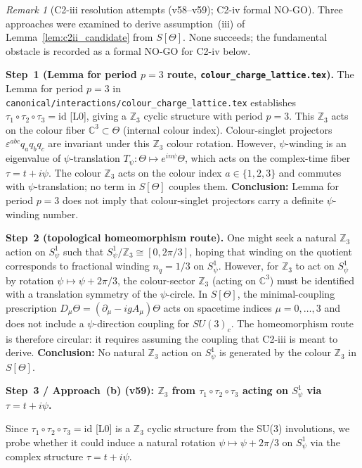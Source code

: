 \documentclass[12pt,a4paper]{article}
\theoremstyle{definition}
\theoremstyle{remark}
\newtheorem{remark}[theorem]{Remark}
\begin{document}
\begin{remark}[C2-iii resolution attempts (v58–v59); C2-iv formal NO-GO]
\label{rem:c2iii_attempts}
Three approaches were examined to derive assumption~(iii) of
Lemma~\ref{lem:c2ii_candidate} from $S[\Theta]$.  None succeeds;
the fundamental obstacle is recorded as a formal NO-GO for C2-iv below.

\medskip
\noindent\textbf{Step~1 (Lemma for period $p=3$ route, \texttt{colour\_charge\_lattice.tex}).}
The Lemma for period $p=3$ in
\texttt{canonical/interactions/colour\_charge\_lattice.tex}
establishes $\tau_1\circ\tau_2\circ\tau_3=\mathrm{id}$ [L0], giving a
$\mathbb{Z}_3$ cyclic structure with period $p=3$.
This $\mathbb{Z}_3$ acts on the colour fiber $\mathbb{C}^3\subset\Theta$
(internal colour index).
Colour-singlet projectors $\varepsilon^{abc}q_aq_bq_c$ are invariant under
this $\mathbb{Z}_3$ colour rotation.
However, $\psi$-winding is an eigenvalue of $\psi$-translation
$T_\psi\colon\Theta\mapsto e^{in\psi}\Theta$, which acts on the complex-time
fiber $\tau=t+i\psi$.
The colour $\mathbb{Z}_3$ acts on the colour index $a\in\{1,2,3\}$ and
commutes with $\psi$-translation; no term in $S[\Theta]$ couples them.
\textbf{Conclusion:} Lemma for period $p=3$ does not imply that colour-singlet
projectors carry a definite $\psi$-winding number.

\medskip
\noindent\textbf{Step~2 (topological homeomorphism route).}
One might seek a natural $\mathbb{Z}_3$ action on $S^1_\psi$ such that
$S^1_\psi/\mathbb{Z}_3\cong[0,2\pi/3]$, hoping that winding on the
quotient corresponds to fractional winding $n_q=1/3$ on $S^1_\psi$.
However, for $\mathbb{Z}_3$ to act on $S^1_\psi$ by rotation
$\psi\mapsto\psi+2\pi/3$, the colour-sector $\mathbb{Z}_3$ (acting on
$\mathbb{C}^3$) must be identified with a translation symmetry of the
$\psi$-circle.
In $S[\Theta]$, the minimal-coupling prescription
$D_\mu\Theta=(\partial_\mu-igA_\mu)\Theta$ acts on spacetime indices
$\mu=0,\ldots,3$ and does not include a $\psi$-direction coupling for
$SU(3)_c$.
The homeomorphism route is therefore circular: it requires assuming
the coupling that C2-iii is meant to derive.
\textbf{Conclusion:} No natural $\mathbb{Z}_3$ action on $S^1_\psi$
is generated by the colour $\mathbb{Z}_3$ in $S[\Theta]$.

\medskip
\noindent\textbf{Step~3 / Approach~(b) (v59): $\mathbb{Z}_3$ from
$\tau_1\circ\tau_2\circ\tau_3$ acting on $S^1_\psi$ via $\tau=t+i\psi$.}

Since $\tau_1\circ\tau_2\circ\tau_3=\mathrm{id}$ [L0] is a $\mathbb{Z}_3$
cyclic structure from the SU(3) involutions, we probe whether it could
induce a natural rotation $\psi\mapsto\psi+2\pi/3$ on $S^1_\psi$ via the
complex structure $\tau=t+i\psi$.


\end{remark}
\end{document}
